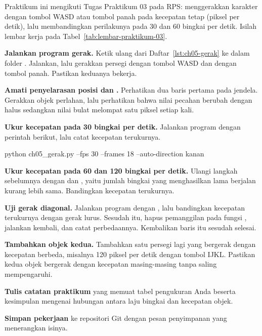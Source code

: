 \begin{praktikumbox}
Praktikum ini mengikuti Tugas Praktikum 03 pada RPS: menggerakkan karakter
dengan tombol WASD atau tombol panah pada kecepatan tetap (piksel per detik),
lalu membandingkan perilakunya pada 30 dan 60 bingkai per detik. Isilah lembar
kerja pada Tabel~\ref{tab:lembar-praktikum-03}.

\begin{langkah}
  \item \textbf{Jalankan program gerak.} Ketik ulang  dari
        Daftar~\ref{lst:ch05-gerak} ke dalam folder . Jalankan, lalu
        gerakkan persegi dengan tombol WASD dan dengan tombol panah. Pastikan
        keduanya bekerja.

  \item \textbf{Amati penyelarasan posisi dan .} Perhatikan dua
        baris pertama pada jendela. Gerakkan objek perlahan, lalu perhatikan
        bahwa nilai pecahan berubah dengan halus sedangkan nilai bulat melompat
        satu piksel setiap kali.

  \item \textbf{Ukur kecepatan pada 30 bingkai per detik.} Jalankan program
        dengan perintah berikut, lalu catat kecepatan terukurnya.
\begin{kodekeluaran}
python ch05_gerak.py --fps 30 --frames 18 --auto-direction kanan
\end{kodekeluaran}

  \item \textbf{Ukur kecepatan pada 60 dan 120 bingkai per detik.} Ulangi
        langkah sebelumnya dengan  dan
        , yaitu jumlah bingkai yang menghasilkan
        lama berjalan kurang lebih sama. Bandingkan kecepatan terukurnya.

  \item \textbf{Uji gerak diagonal.} Jalankan program dengan
        , lalu bandingkan kecepatan terukurnya
        dengan gerak lurus. Sesudah itu, hapus pemanggilan 
        pada fungsi , jalankan kembali, dan catat
        perbedaannya. Kembalikan baris itu sesudah selesai.

  \item \textbf{Tambahkan objek kedua.} Tambahkan satu persegi lagi yang
        bergerak dengan kecepatan berbeda, misalnya 120 piksel per detik
        dengan tombol IJKL. Pastikan kedua objek bergerak dengan kecepatan
        masing-masing tanpa saling mempengaruhi.

  \item \textbf{Tulis catatan praktikum} yang memuat tabel pengukuran Anda
        beserta kesimpulan mengenai hubungan antara laju bingkai dan kecepatan
        objek.

  \item \textbf{Simpan pekerjaan} ke repositori Git dengan pesan penyimpanan
        yang menerangkan isinya.
\end{langkah}
\end{praktikumbox}

